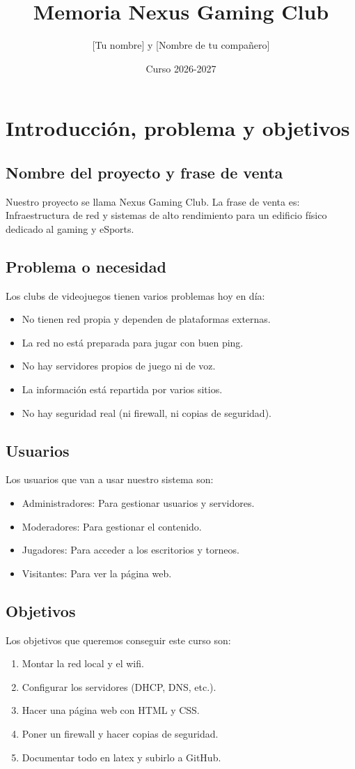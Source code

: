\documentclass{article}
\title{Memoria Nexus Gaming Club}
\author{[Tu nombre] y [Nombre de tu compañero]}
\date{Curso 2026-2027}
\begin{document}
\maketitle

\section{Introducción, problema y objetivos}

\subsection{Nombre del proyecto y frase de venta}
Nuestro proyecto se llama Nexus Gaming Club. 
La frase de venta es: Infraestructura de red y sistemas de alto rendimiento para un edificio físico dedicado al gaming y eSports.

\subsection{Problema o necesidad}
Los clubs de videojuegos tienen varios problemas hoy en día:
\begin{itemize}
    \item No tienen red propia y dependen de plataformas externas.
    \item La red no está preparada para jugar con buen ping.
    \item No hay servidores propios de juego ni de voz.
    \item La información está repartida por varios sitios.
    \item No hay seguridad real (ni firewall, ni copias de seguridad).
\end{itemize}

\subsection{Usuarios}
Los usuarios que van a usar nuestro sistema son:
\begin{itemize}
    \item Administradores: Para gestionar usuarios y servidores.
    \item Moderadores: Para gestionar el contenido.
    \item Jugadores: Para acceder a los escritorios y torneos.
        \item Visitantes: Para ver la página web.
\end{itemize}

\subsection{Objetivos}
Los objetivos que queremos conseguir este curso son:
\begin{enumerate}
    \item Montar la red local y el wifi.
    \item Configurar los servidores (DHCP, DNS, etc.).
    \item Hacer una página web con HTML y CSS.
    \item Poner un firewall y hacer copias de seguridad.
    \item Documentar todo en latex y subirlo a GitHub.
\end{enumerate}
\end{document}
